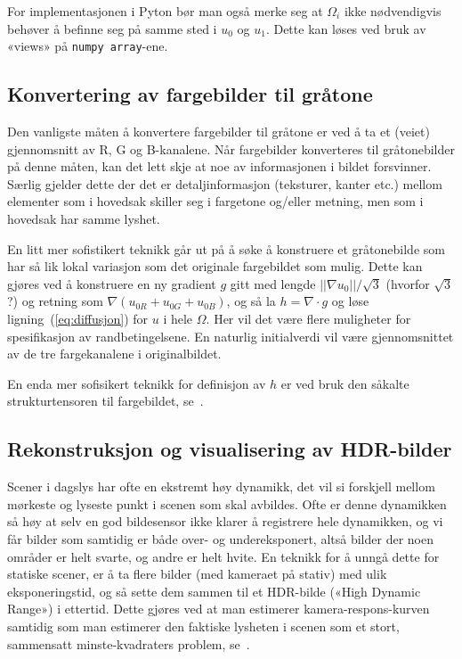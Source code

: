 \documentclass[11pt,a4paper]{article}
\begin{document}
For implementasjonen i Pyton bør man også merke seg at $\Omega_i$ ikke nødvendigvis behøver å befinne seg på samme sted i $u_0$ og $u_1$. Dette kan løses ved bruk av «views» på \texttt{numpy array}-ene.

\subsection{Konvertering av fargebilder til gråtone}

Den vanligste måten å konvertere fargebilder til gråtone er ved å ta et (veiet) gjennomsnitt av R, G og B-kanalene. Når fargebilder konverteres til gråtonebilder på denne måten, kan det lett skje at noe av informasjonen i bildet forsvinner. Særlig gjelder dette der det er detaljinformasjon (teksturer, kanter etc.) mellom elementer som i hovedsak skiller seg i fargetone og/eller metning, men som i hovedsak har samme lyshet.

En litt mer sofistikert teknikk går ut på å søke å konstruere et gråtonebilde som har så lik lokal variasjon som det originale fargebildet som mulig. Dette kan gjøres ved å konstruere en ny gradient $g$ gitt med lengde $||\nabla u_0||/\sqrt{3}$ (hvorfor $\sqrt{3}$?) og retning som $\nabla(u_{0R} + u_{0G} + u_{0B})$, og så la $h = \nabla\cdot g$ og løse ligning~(\ref{eq:diffusjon}) for $u$ i hele $\Omega$. Her vil det være flere muligheter for spesifikasjon av randbetingelsene. En naturlig initialverdi vil være gjennomsnittet av de tre fargekanalene i originalbildet.

En enda mer sofisikert teknikk for definisjon av $h$ er ved bruk den såkalte strukturtensoren til fargebildet, se~\cite{Alsam:08}.

\subsection{Rekonstruksjon og visualisering av HDR-bilder}

Scener i dagslys har ofte en ekstremt høy dynamikk, det vil si forskjell mellom mørkeste og lyseste punkt i scenen som skal avbildes. Ofte er denne dynamikken så høy at selv en god bildesensor ikke klarer å registrere hele dynamikken, og vi får bilder som samtidig er både over- og undereksponert, altså bilder der noen områder er helt svarte, og andre er helt hvite. En teknikk for å unngå dette for statiske scener, er å ta flere bilder (med kameraet på stativ) med ulik eksponeringstid, og så sette dem sammen til et HDR-bilde («High Dynamic Range») i ettertid. Dette gjøres ved at man estimerer kamera-respons-kurven samtidig som man estimerer den faktiske lysheten i scenen som et stort, sammensatt minste-kvadraters problem, se~\cite{Debevec:97}.
\end{document}
